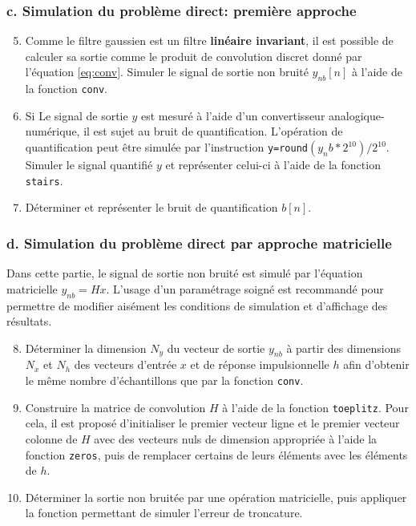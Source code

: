 \documentclass{article}
\begin{document}
\subsubsection*{c. Simulation du problème direct: première approche}
\begin{enumerate}
	\setcounter{enumi}{4}
	\item Comme le filtre gaussien est un filtre \textbf{linéaire invariant}, il est possible de calculer sa sortie comme le produit de convolution discret donné par l'équation \eqref{eq:conv}. Simuler le signal de sortie non bruité $y_{nb}[n]$ à l'aide de la fonction \texttt{conv}.
	
	\item Si Le signal de sortie $y$ est mesuré à l'aide d'un convertisseur analogique-numérique, il est sujet au bruit de quantification. L'opération de quantification peut être simulée par l'instruction \texttt{y=round}$(y_nb*2^{10})/2^{10}$. Simuler le signal quantifié $y$ et représenter celui-ci à l'aide de la fonction \texttt{stairs}.
	
	\item Déterminer et représenter le bruit de quantification $b[n]$.
\end{enumerate}

\subsubsection*{d. Simulation du problème direct par approche matricielle}
Dans cette partie, le signal de sortie non bruité est simulé par l’équation matricielle $y_{nb} = Hx$. L’usage d’un paramétrage soigné est recommandé pour permettre de modifier aisément les conditions de simulation et d’affichage des résultats.
\begin{enumerate}
	\setcounter{enumi}{7}
	\item Déterminer la dimension $N_y$ du vecteur de sortie $y_{nb}$ à partir des dimensions $N_x$ et $N_h$ des vecteurs d’entrée $x$ et de réponse impulsionnelle $h$ afin d’obtenir le même nombre d’échantillons que par la fonction \texttt{conv}.
	\item Construire la matrice de convolution $H$ à l’aide de la fonction \texttt{toeplitz}. Pour cela, il est proposé d’initialiser le premier vecteur ligne et le premier vecteur colonne de $H$ avec des vecteurs nuls de dimension appropriée à l’aide la fonction \texttt{zeros}, puis de remplacer certains de leurs éléments avec les éléments de $h$.
	\item Déterminer la sortie non bruitée par une opération matricielle, puis appliquer la fonction permettant de simuler l’erreur de troncature.
\end{enumerate}
\end{document}
